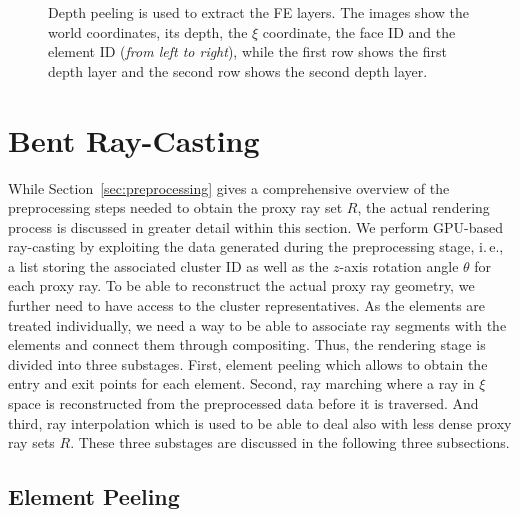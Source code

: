 \documentclass[journal]{vgtc}                %
\begin{document}
\begin{figure}[t]
    \caption{Depth peeling is used to extract the FE layers. The images show the world coordinates, its depth, the $\xi$ coordinate, the face ID and the element ID ({\it from left to right}), while the first row shows the first depth layer and the second row shows the second depth layer.}
    \label{fig:depthpeeling}
\end{figure}

\section{Bent Ray-Casting}\label{sec:rendering}
While Section~\ref{sec:preprocessing} gives a comprehensive overview of the preprocessing steps needed to obtain the proxy ray set $R$, the actual rendering process is discussed in greater detail within this section. We perform GPU-based ray-casting by exploiting the data generated during the preprocessing stage, i.\,e., a list storing the associated cluster ID as well as the $z$-axis rotation angle $\theta$ for each proxy ray. To be able to reconstruct the actual proxy ray geometry, we further need to have access to the cluster representatives. As the elements are treated individually, we need a way to be able to associate ray segments with the elements and connect them through compositing. Thus, the rendering stage is divided into three substages. First, element peeling which allows to obtain the entry and exit points for each element. Second, ray marching where a ray in $\xi$ space is reconstructed from the preprocessed data before it is traversed. And third, ray interpolation which is used to be able to deal also with less dense proxy ray sets $R$. These three substages are discussed in the following three subsections.


\subsection{Element Peeling}
\end{document}
